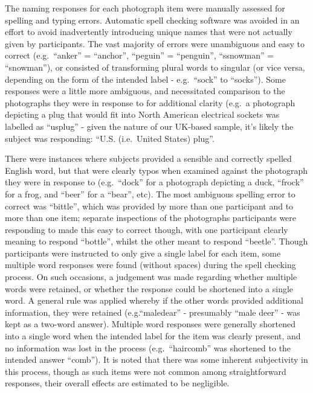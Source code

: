 \documentclass[
  11pt,
]{article}
\begin{document}
The naming responses for each photograph item were manually assessed for
spelling and typing errors. Automatic spell checking software was
avoided in an effort to avoid inadvertently introducing unique names
that were not actually given by participants. The vast majority of
errors were unambiguous and easy to correct (e.g.~``anker'' =
``anchor'', ``peguin'' = ``penguin'', ``ssnowman'' = ``snowman''), or
consisted of transforming plural words to singular (or vice versa,
depending on the form of the intended label - e.g.~``sock'' to
``socks''). Some responses were a little more ambiguous, and
necessitated comparison to the photographs they were in response to for
additional clarity (e.g.~a photograph depicting a plug that would fit
into North American electrical sockets was labelled as ``usplug'' -
given the nature of our UK-based sample, it's likely the subject was
responding: ``U.S. (i.e.~United States) plug''.

There were instances where subjects provided a sensible and correctly
spelled English word, but that were clearly typos when examined against
the photograph they were in response to (e.g.~``dock'' for a photograph
depicting a duck, ``frock'' for a frog, and ``beer'' for a ``bear'',
etc). The most ambiguous spelling error to correct was ``bittle'', which
was provided by more than one participant and to more than one item;
separate inspections of the photographs participants were responding to
made this easy to correct though, with one participant clearly meaning
to respond ``bottle'', whilst the other meant to respond ``beetle''.
Though participants were instructed to only give a single label for each
item, some multiple word responses were found (without spaces) during
the spell checking process. On such occasions, a judgement was made
regarding whether multiple words were retained, or whether the response
could be shortened into a single word. A general rule was applied
whereby if the other words provided additional information, they were
retained (e.g.``maledear'' - presumably ``male deer'' - was kept as a
two-word answer). Multiple word responses were generally shortened into
a single word when the intended label for the item was clearly present,
and no information was lost in the process (e.g.~``haircomb'' was
shortened to the intended answer ``comb''). It is noted that there was
some inherent subjectivity in this process, though as such items were
not common among straightforward responses, their overall effects are
estimated to be negligible.
\end{document}
